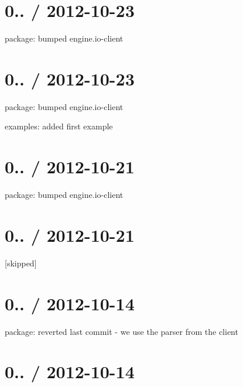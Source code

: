 \section*{0.. / 2012-\/10-\/23 }


\begin{DoxyItemize}
\item package\+: bumped {\ttfamily engine.\+io-\/client}
\end{DoxyItemize}

\section*{0.. / 2012-\/10-\/23 }


\begin{DoxyItemize}
\item package\+: bumped engine.\+io-\/client
\item examples\+: added first example
\end{DoxyItemize}

\section*{0.. / 2012-\/10-\/21 }


\begin{DoxyItemize}
\item package\+: bumped {\ttfamily engine.\+io-\/client}
\end{DoxyItemize}

\section*{0.. / 2012-\/10-\/21 }

\mbox{[}skipped\mbox{]}

\section*{0.. / 2012-\/10-\/14 }


\begin{DoxyItemize}
\item package\+: reverted last commit -\/ we use the parser from the client
\end{DoxyItemize}

\section*{0.. / 2012-\/10-\/14 }


